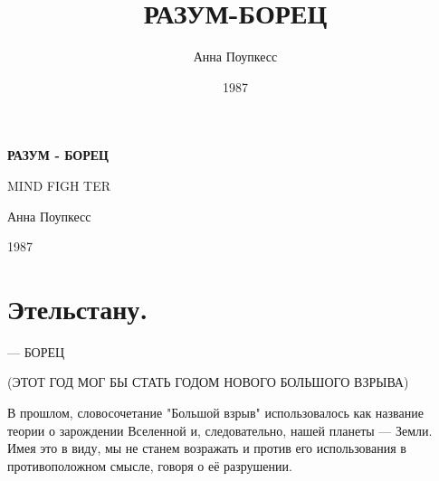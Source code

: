 \documentclass[a5paper, 9pt,
final, openany, twoside=true]{memoir}
\title{РАЗУМ-БОРЕЦ}
\author{Анна Поупкесс}
\date{1987}
\begin{document}
\thispagestyle{empty}
\vspace*{8\baselineskip}

{\centering\sffamily\bfseries\fontsize{32}{0}\selectfont
    РАЗУМ - БОРЕЦ\\
}

{\centering\sffamily\fontsize{18}{20}\selectfont
    M\space I\space N\space D\space 
    F\space I\space G\space H\space 
    T\space E\space R\\
}

{\centering\rmfamily\fontsize{12}{80}\selectfont
    Анна Поупкесс\\
}

{\centering\rmfamily\fontsize{12}{0}\selectfont\vspace{\fill}
    1987\\
}

\newpage{}

\vspace*{2\baselineskip}
\begin{center}
    \begin{KeepFromToc}
        \tableofcontents
    \end{KeepFromToc}
\end{center}
\thispagestyle{empty}
\chapter*{\vspace{5\baselineskip}\Huge{} Этельстану.}

\thispagestyle{empty}

\newpage

\vspace*{5\baselineskip}

\setcounter{page}{1}

\begin{center}
 — БОРЕЦ\bigskip

\noindent(ЭТОТ ГОД МОГ БЫ СТАТЬ ГОДОМ НОВОГО БОЛЬШОГО ВЗРЫВА)
\end{center}

В прошлом, словосочетание "Большой взрыв" использовалось как название теории о зарождении Вселенной и, следовательно, нашей планеты — Земли. Имея это в виду, мы не станем возражать и против его использования в противоположном смысле, говоря о её разрушении.\bigskip
\end{document}
